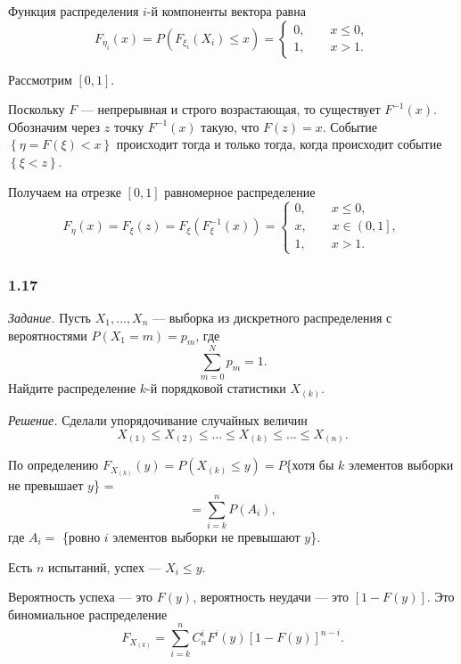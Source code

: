 Функция распределения $i$-й компоненты вектора равна
$$F_{ \eta_i} \left( x \right) =
  P \left( F_{ \xi_i} \left( X_i \right) \leq x \right) =
  \begin{cases}
    0, \qquad x \leq 0, \\
    1, \qquad x > 1.
  \end{cases}$$

Рассмотрим $ \left[ 0, 1 \right] $.

Поскольку $F$ --- непрерывная и строго возрастающая, то существует $F^{-1} \left( x \right) $.
Обозначим через $z$ точку $F^{-1} \left( x \right) $ такую, что $F \left( z \right) = x$.
Событие $ \left\{ \eta = F \left( \xi \right) < x \right\} $ происходит тогда и только тогда,
когда происходит событие $ \left\{ \xi < z \right\} $.

Получаем на отрезке $ \left[ 0, 1 \right] $ равномерное распределение
$$F_{ \eta } \left( x \right) =
  F_{ \xi } \left( z \right) =
  F_{ \xi } \left( F_{ \xi }^{-1} \left( x \right) \right) =
  \begin{cases}
    0, \qquad x \leq 0, \\
    x, \qquad x \in \left( 0, 1 \right] ,\\
    1, \qquad x > 1.
  \end{cases}$$

\subsubsection*{1.17}

\textit{Задание.}
Пусть $X_1, \dotsc, X_n$ ---
выборка из дискретного распределения с вероятностями $P \left( X_1 = m \right) = p_m$, где
$$ \sum \limits_{m = 0}^N p_m =
  1.$$
Найдите распределение $k$-й порядковой статистики $X_{ \left( k \right) }$.

\textit{Решение.}
Сделали упорядочивание случайных величин
$$X_{ \left( 1 \right) } \leq
  X_{ \left( 2 \right) } \leq
  \dotsc \leq
  X_{ \left( k \right) } \leq
  \dotsc \leq
  X_{ \left( n \right)}.$$

По определению
$F_{X_{ \left( k \right) }} \left( y \right) =
  P \left( X_{ \left( k \right) } \leq y \right) =
  P$\{хотя бы $k$ элементов выборки не превышает $y$\} =
$$= \sum \limits_{i = k}^n P(A_i),$$
где $A_i =$ \{ровно $i$ элементов выборки не превышают $y$\}.

Есть $n$ испытаний, успех --- $X_i \leq y$.

Вероятность успеха --- это $F \left( y \right) $, вероятность неудачи ---
это $ \left[ 1 - F \left( y \right) \right] $.
Это биномиальное распределение
$$F_{X_{ \left( k \right) }} =
  \sum \limits_{i = k}^n
    C_n^i F^i \left( y \right) \left[ 1 - F \left( y \right) \right]^{n - i}.$$

